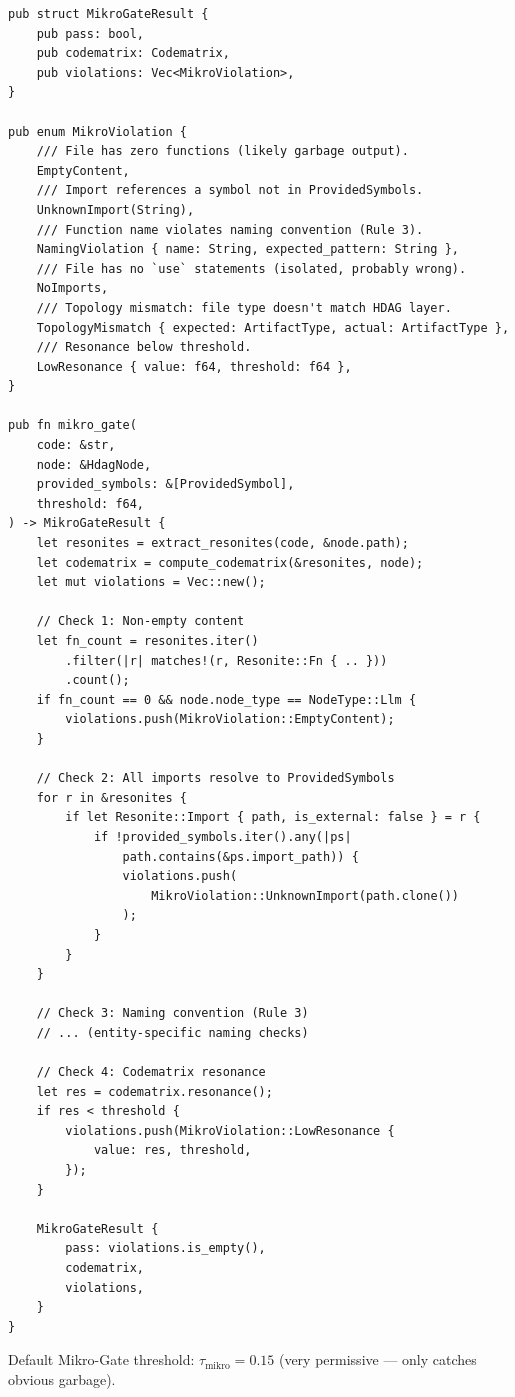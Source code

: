 \documentclass[11pt,a4paper]{article}
\begin{document}
\begin{lstlisting}[style=rust]
pub struct MikroGateResult {
    pub pass: bool,
    pub codematrix: Codematrix,
    pub violations: Vec<MikroViolation>,
}

pub enum MikroViolation {
    /// File has zero functions (likely garbage output).
    EmptyContent,
    /// Import references a symbol not in ProvidedSymbols.
    UnknownImport(String),
    /// Function name violates naming convention (Rule 3).
    NamingViolation { name: String, expected_pattern: String },
    /// File has no `use` statements (isolated, probably wrong).
    NoImports,
    /// Topology mismatch: file type doesn't match HDAG layer.
    TopologyMismatch { expected: ArtifactType, actual: ArtifactType },
    /// Resonance below threshold.
    LowResonance { value: f64, threshold: f64 },
}

pub fn mikro_gate(
    code: &str,
    node: &HdagNode,
    provided_symbols: &[ProvidedSymbol],
    threshold: f64,
) -> MikroGateResult {
    let resonites = extract_resonites(code, &node.path);
    let codematrix = compute_codematrix(&resonites, node);
    let mut violations = Vec::new();
    
    // Check 1: Non-empty content
    let fn_count = resonites.iter()
        .filter(|r| matches!(r, Resonite::Fn { .. }))
        .count();
    if fn_count == 0 && node.node_type == NodeType::Llm {
        violations.push(MikroViolation::EmptyContent);
    }
    
    // Check 2: All imports resolve to ProvidedSymbols
    for r in &resonites {
        if let Resonite::Import { path, is_external: false } = r {
            if !provided_symbols.iter().any(|ps| 
                path.contains(&ps.import_path)) {
                violations.push(
                    MikroViolation::UnknownImport(path.clone())
                );
            }
        }
    }
    
    // Check 3: Naming convention (Rule 3)
    // ... (entity-specific naming checks)
    
    // Check 4: Codematrix resonance
    let res = codematrix.resonance();
    if res < threshold {
        violations.push(MikroViolation::LowResonance {
            value: res, threshold,
        });
    }
    
    MikroGateResult {
        pass: violations.is_empty(),
        codematrix,
        violations,
    }
}
\end{lstlisting}

Default Mikro-Gate threshold: $\tau_\text{mikro} = 0.15$ 
(very permissive --- only catches obvious garbage).
\end{document}
